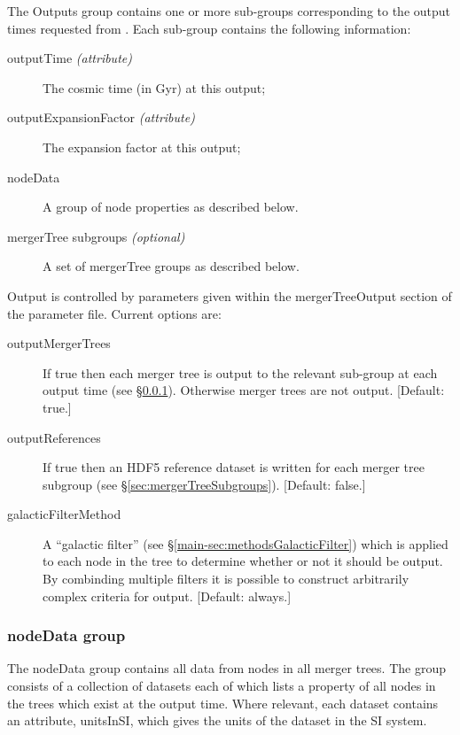 The {\normalfont \ttfamily Outputs} group contains one or more sub-groups corresponding to the output times requested from \glc. Each sub-group contains the following information:
\begin{description}
 \item[{\normalfont \ttfamily outputTime} \emph{(attribute)}] The cosmic time (in Gyr) at this output;
 \item[{\normalfont \ttfamily outputExpansionFactor} \emph{(attribute)}] The expansion factor at this output;
 \item[{\normalfont \ttfamily nodeData}] A group of node properties as described below.
 \item[{\normalfont \ttfamily mergerTree} subgroups \emph{(optional)}] A set of {\normalfont \ttfamily mergerTree} groups as described below.
\end{description}

Output is controlled by parameters given within the {\normalfont \ttfamily mergerTreeOutput} section of the parameter file. Current options are:
\begin{description}
\item[{\normalfont \ttfamily outputMergerTrees}] If {\normalfont \ttfamily true} then each merger tree is output to the relevant sub-group at each output time (see \S\ref{sec:nodeDataGroup}). Otherwise merger trees are not output. [Default: {\normalfont \ttfamily true}.]
\item[{\normalfont \ttfamily outputReferences}] If {\normalfont \ttfamily true} then an HDF5 reference dataset is written for each merger tree subgroup (see \S\ref{sec:mergerTreeSubgroups}). [Default: {\normalfont \ttfamily false}.]
\item[{\normalfont \ttfamily galacticFilterMethod}] A ``galactic filter'' (see \S\ref{main-sec:methodsGalacticFilter}) which is applied to each node in the tree to determine whether or not it should be output. By combinding multiple filters it is possible to construct arbitrarily complex criteria for output. [Default: {\normalfont \ttfamily always}.]
\end{description}

\subsubsection{nodeData group}\label{sec:nodeDataGroup}

The {\normalfont \ttfamily nodeData} group contains all data from nodes in all merger trees. The group consists of a collection of datasets each of which lists a property of all nodes in the trees which exist at the output time. Where relevant, each dataset contains an attribute, {\normalfont \ttfamily unitsInSI}, which gives the units of the dataset in the SI system.

